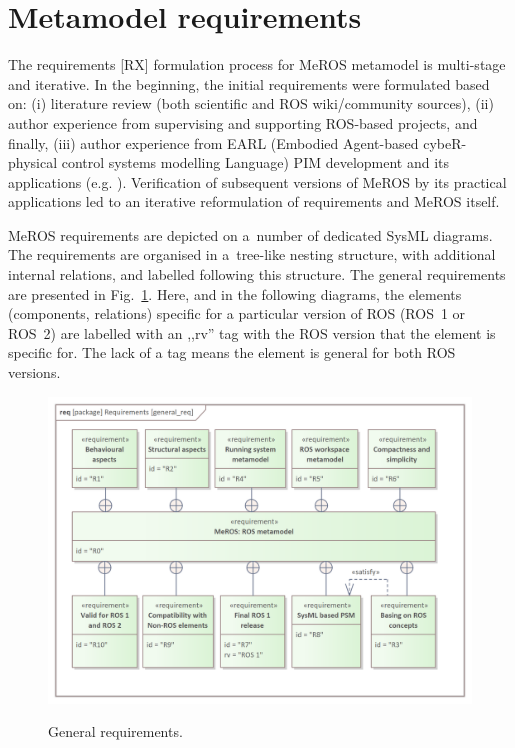 \section{Metamodel requirements}
\label{sec:requirements}
The requirements [RX] formulation process for MeROS metamodel is multi-stage and iterative. In the beginning, the initial requirements were formulated based on: (i) literature review (both scientific and ROS wiki/community sources), (ii) author experience from supervising and supporting ROS-based projects, and finally, (iii) author experience from EARL (Embodied Agent-based cybeR-physical control systems modelling Language) \cite{earl2020} PIM development and its applications (e.g. \cite{tasker2020,karwowski2021hubero,en14206693-grav-comp}). Verification of subsequent versions of MeROS by its practical applications led to an iterative reformulation of requirements and MeROS itself.

MeROS requirements are depicted on a~number of dedicated SysML diagrams. The requirements are organised in a~tree-like nesting structure, with additional internal relations, and labelled following this structure. The general requirements are presented in Fig.~\ref{fig:general_req}. Here, and in the following diagrams, the elements (components, relations) specific for a particular version of ROS (ROS~1 or ROS~2) are labelled with an ,,rv''  tag with the ROS version that the element is specific for. The lack of a tag means the element is general for both ROS versions.


\begin{figure}[H]
	\centering
	\begin{center}
	{\includegraphics[scale=0.9]{../imgs/requirement_pkg/general_req.png}}
	\end{center}
	\caption{General requirements.}
	\label{fig:general_req}
\end{figure}


